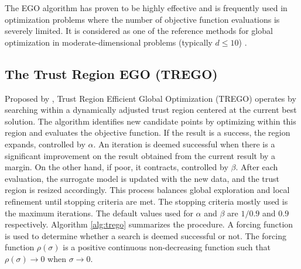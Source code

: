\documentclass [PhD] {package/uclathes}
\begin{document}
The EGO algorithm has proven to be highly effective and is frequently used in optimization problems where the number of objective function evaluations is severely limited. It is considered as one of the reference methods for global optimization in moderate-dimensional problems (typically \(d \leq 10\)) \parencite{jones2001taxonomy}.

\subsection{The Trust Region EGO (TREGO)}
Proposed by \textcite{diouane2023trego}, Trust Region Efficient Global Optimization (TREGO) operates by searching within a dynamically adjusted trust region centered at the current best solution. The algorithm identifies new candidate points by optimizing within this region and evaluates the objective function.
If the result is a success, the region expands, controlled by \(\alpha\). An iteration is deemed successful when there is a significant improvement on the result obtained from the current result by a margin.
On the other hand, if poor, it contracts, controlled by \(\beta\). After each evaluation, the surrogate model is updated with the new data, and the trust region is resized accordingly. This process balances global exploration and local refinement until stopping criteria are met. The stopping criteria mostly used is the maximum iterations.
The default values used for \(\alpha\) and \(\beta\) are $1/0.9$ and $0.9$ respectively. Algorithm \ref{alg:trego} summarizes the procedure. A forcing function is used to determine whether a search is deemed successful or not. The forcing function $\rho(\sigma)$ is a positive continuous non-decreasing function such that $\rho(\sigma) \rightarrow 0$ when $\sigma \rightarrow 0$.
\end{document}
